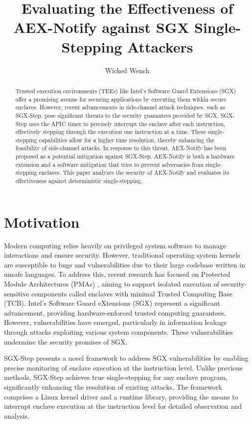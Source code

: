 \documentclass{llncs}
\title{Evaluating the Effectiveness of AEX-Notify against SGX Single-Stepping Attackers}
\author{Wicked Wench}
\institute{	University of L\"ubeck, Germany}
\begin{document}
\maketitle

\begin{abstract}
  Trusted execution environments (TEEs) like Intel's Software Guard Extensions
  (SGX) offer a promising avenue for securing applications by executing them
  within secure enclaves.
  However, recent advancements in side-channel attack techniques, such as
  SGX-Step, pose significant threats to the security guarantees provided by
  SGX.
  SGX-Step uses the APIC timer to precisely interrupt the enclave after each
  instruction, effectively stepping through the execution one instruction at a
  time.
  These single-stepping capabilities allow for a higher time resolution,
  thereby enhancing the feasibility of side-channel attacks.
  In response to this threat, AEX-Notify has been proposed as a potential
  mitigation against SGX-Step. AEX-Notify is both a hardware extension and a
  software mitigation that tries to prevent adversaries from single-stepping
  enclaves.
  This paper analyzes the security of AEX-Notify and evaluates its
  effectiveness against deterministic single-stepping.
\end{abstract}

\section{Motivation}

Modern computing relies heavily on privileged system software to manage
interactions and ensure security.
However, traditional operating system kernels are susceptible to bugs and
vulnerabilities due to their large codebase written in unsafe languages.
To address this, recent research has focused on Protected Module Architectures
(PMAs) \cite{MaeneGCMFV18,CostanLD16,Intel17}, aiming to support isolated execution of security-sensitive components
called enclaves with minimal Trusted Computing Base (TCB).
Intel’s Software Guard eXtensions (SGX) \cite{Intel16,Intel17} represent a
significant advancement, providing hardware-enforced trusted computing
guarantees.
However, vulnerabilities have emerged, particularly in information leakage
through attacks exploiting various system components.
These vulnerabilities undermine the security promises of SGX.

SGX-Step \cite{BulckPS17} presents a novel framework to address SGX vulnerabilities by enabling
precise monitoring of enclave execution at the instruction level.
Unlike previous methods, SGX-Step achieves true single-stepping for any enclave
program, significantly enhancing the resolution of existing attacks.
The framework comprises a Linux kernel driver and a runtime library, providing
the means to interrupt enclave execution at the instruction level for detailed
observation and analysis.
\end{document}
